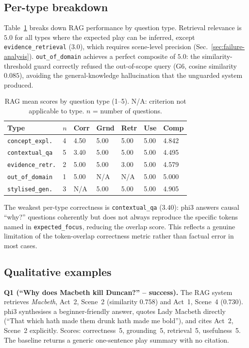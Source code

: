 \documentclass[10pt,conference]{IEEEtran}
\begin{document}
\subsection{Per-type breakdown}

Table~\ref{tab:by-type} breaks down RAG performance by question type.
Retrieval relevance is $5.0$ for all types where the expected play can
be inferred, except \texttt{evidence\_retrieval} ($3.0$), which
requires scene-level precision (Sec.~\ref{sec:failure-analysis}).
\texttt{out\_of\_domain} achieves a perfect composite of $5.0$: the
similarity-threshold guard correctly refused the out-of-scope query
(G6, cosine similarity $0.085$), avoiding the general-knowledge
hallucination that the unguarded system produced.

\begin{table}[h]
\centering
\caption{RAG mean scores by question type (1--5). N/A: criterion not
applicable to type. $n$ = number of questions.}
\label{tab:by-type}
\small
\begin{tabularx}{\linewidth}{lXXXXXX}
\toprule
Type & $n$ & Corr & Grnd & Retr & Use & Comp \\
\midrule
\texttt{concept\_expl.}   & 4 & 4.50 & 5.00 & 5.00 & 5.00 & 4.842 \\
\texttt{contextual\_qa}   & 5 & 3.40 & 5.00 & 5.00 & 5.00 & 4.495 \\
\texttt{evidence\_retr.}  & 2 & 5.00 & 5.00 & 3.00 & 5.00 & 4.579 \\
\texttt{out\_of\_domain}  & 1 & 5.00 & N/A  & N/A  & 5.00 & 5.000 \\
\texttt{stylised\_gen.}   & 3 & N/A  & 5.00 & 5.00 & 5.00 & 4.905 \\
\bottomrule
\end{tabularx}
\end{table}

The weakest per-type correctness is \texttt{contextual\_qa} ($3.40$):
phi3 answers causal ``why?'' questions coherently but does not always
reproduce the specific tokens named in \texttt{expected\_focus},
reducing the overlap score. This reflects a genuine limitation of
the token-overlap correctness metric rather than factual error in
most cases.

\subsection{Qualitative examples}

\textbf{Q1 (``Why does Macbeth kill Duncan?'' -- success).}
The RAG system retrieves \emph{Macbeth}, Act~2, Scene~2 (similarity
$0.758$) and Act~1, Scene~4 ($0.730$). phi3 synthesises a
beginner-friendly answer, quotes Lady Macbeth directly
(``That which hath made them drunk hath made me bold''), and cites
Act~2, Scene~2 explicitly. Scores: correctness~5, grounding~5,
retrieval~5, usefulness~5. The baseline returns a generic
one-sentence play summary with no citation.
\end{document}
